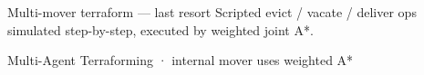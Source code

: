 \begin{frame}{Multi-mover terraform — last resort}
    {Scripted evict / vacate / deliver ops simulated step-by-step, executed by weighted joint A*.}

  \vspace{-0.1cm}
  \begin{center}
    \footnotesize\textcolor{muted}{Multi-Agent Terraforming ·
      internal mover uses weighted A*}
  \end{center}
\end{frame}
